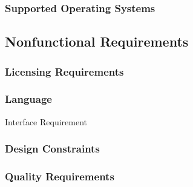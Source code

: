     \subsubsection{Supported Operating Systems}
    \label{requirements:os}

\subsection{Nonfunctional Requirements}
\label{requirements:functional}

    \subsubsection{Licensing Requirements}
    \label{requirements:license}


    \subsubsection{Language}
    \label{requirements:language}


    \begin{requirement}{Interface Requirement}
    \end{requirement}



    \subsubsection{Design Constraints}
    \label{requirements:constraints}

    \subsubsection{Quality Requirements}
    \label{requirements:quality}

